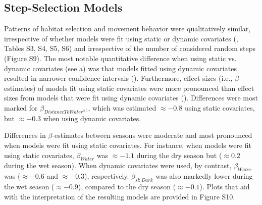 \documentclass[abstract=on,10pt,a4paper,bibliography=totocnumbered]{article}
\begin{document}
\subsection{Step-Selection Models}

Patterns of habitat selection and movement behavior were qualitatively similar,
irrespective of whether models were fit using static or dynamic covariates
(, Tables S3, S4, S5, S6) and irrespective of the number of
considered random steps (Figure S9). The most notable quantitative difference
when using static vs. dynamic covariates (see a) was
that models fitted using dynamic covariates resulted in narrower confidence
intervals (). Furthermore, effect sizes (i.e.,
$\beta$-estimates) of models fit using static covariates were more pronounced
than effect sizes from models that were fit using dynamic covariates
(). Differences were most marked for
$\beta_{DistanceToWater^{0.5}}$, which was estimated $\approx -0.8$ using static
covariates, but $\approx -0.3$ when using dynamic covariates.

Differences in $\beta$-estimates between seasons were moderate and most
pronounced when models were fit using static covariates. For instance, when
models were fit using static covariates, $\beta_{Water}$ was $\approx -1.1$
during the dry season but ($\approx 0.2$ during the wet season). When dynamic
covariates were used, by contrast, $\beta_{Water}$ was ($\approx -0.6$ and
$\approx -0.3$), respectively. $\beta_{sl:Dark}$ was also markedly lower during
the wet season ($\approx -0.9$), compared to the dry season ($\approx -0.1$).
Plots that aid with the interpretation of the resulting models are provided in
Figure S10.
\end{document}
